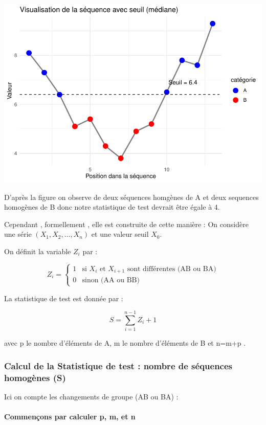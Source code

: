 \documentclass[
  12pt,
]{article}
\begin{document}
\includegraphics{Stat_non_para_files/figure-latex/unnamed-chunk-44-1.pdf}

D'après la figure on observe de deux séquences homgènes de A et deux
sequences homogènes de B donc notre statistique de test devrait être
égale à 4.

Cependant , formellement , elle est construite de cette manière : On
considère une série \((X_1, X_2, \ldots, X_n)\) et une valeur seuil
\(X_0\).

On définit la variable \(Z_i\) par :

\[
Z_i =
\begin{cases}
1 & \text{si } X_i \text{ et } X_{i+1} \text{ sont différentes (AB ou BA)} \\
0 & \text{sinon (AA ou BB)}
\end{cases}
\]

La statistique de test est donnée par :

\[
S = \sum_{i = 1}^{n - 1} Z_i + 1
\]

avec p le nombre d'éléments de A, m le nombre d'éléments de B et n=m+p .

\subsubsection{Calcul de la Statistique de test : nombre de séquences
homogènes
(S)}\label{calcul-de-la-statistique-de-test-nombre-de-suxe9quences-homoguxe8nes-s}

Ici on compte les changements de groupe (AB ou BA) :

\paragraph{Commençons par calculer p, m, et
n}\label{commenuxe7ons-par-calculer-p-m-et-n}
\end{document}
